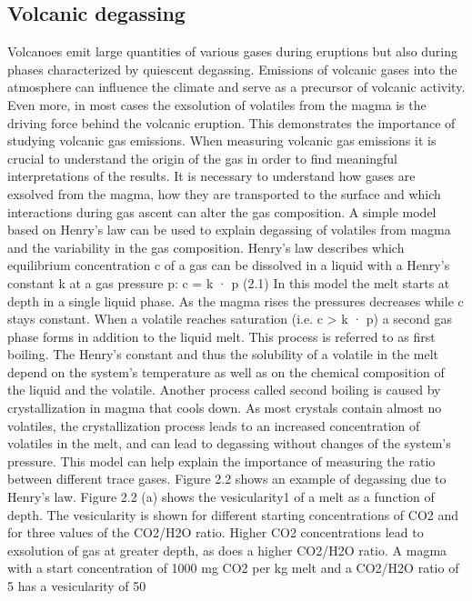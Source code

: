 \documentclass  [
  paper    = a4,
  BCOR     = 10mm,
  twoside,
  fontsize = 12pt,
  fleqn,
  toc      = bibnumbered,
  toc      = listofnumbered,
  numbers  = noendperiod,
  headings = normal,
  listof   = leveldown,
  version  = 3.03
]                                       {scrreprt}
\begin{document}
{	\subsection{Volcanic degassing}
	Volcanoes emit large quantities of various gases during eruptions but also during
	phases characterized by quiescent degassing. Emissions of volcanic gases into the
	atmosphere can influence the climate and serve as a precursor of volcanic activity.
	Even more, in most cases the exsolution of volatiles from the magma is the
	driving force behind the volcanic eruption. This demonstrates the importance of
	studying volcanic gas emissions.
	When measuring volcanic gas emissions it is crucial to understand the origin of
	the gas in order to find meaningful interpretations of the results. It is necessary to
	understand how gases are exsolved from the magma, how they are transported to
	the surface and which interactions during gas ascent can alter the gas composition.
	A simple model based on Henry’s law can be used to explain degassing of volatiles
	from magma and the variability in the gas composition. Henry’s law describes
	which equilibrium concentration c of a gas can be dissolved in a liquid with a
	Henry’s constant k at a gas pressure p:
	c = k · p (2.1)
	In this model the melt starts at depth in a single liquid phase. As the magma
	rises the pressures decreases while c stays constant. When a volatile reaches
	saturation (i.e. c > k · p) a second gas phase forms in addition to the liquid melt.
	This process is referred to as first boiling. The Henry’s constant and thus the
	solubility of a volatile in the melt depend on the system’s temperature as well
	as on the chemical composition of the liquid and the volatile. Another process
	called second boiling is caused by crystallization in magma that cools down. As
	most crystals contain almost no volatiles, the crystallization process leads to
	an increased concentration of volatiles in the melt, and can lead to degassing
	without changes of the system’s pressure.
	This model can help explain the importance of measuring the ratio between
	different trace gases. Figure 2.2 shows an example of degassing due to Henry’s
	law. Figure 2.2 (a) shows the vesicularity1 of a melt as a function of depth. The
	vesicularity is shown for different starting concentrations of CO2 and for three
	values of the CO2/H2O ratio. Higher CO2 concentrations lead to exsolution of
	gas at greater depth, as does a higher CO2/H2O ratio. A magma with a start
	concentration of 1000 mg CO2 per kg melt and a CO2/H2O ratio of 5 has a
	vesicularity of 50%
}
\end{document}

